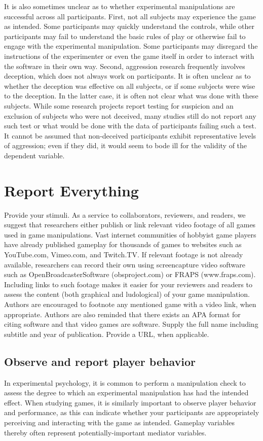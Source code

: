It is also sometimes unclear as to whether experimental manipulations are successful across all participants. First, not all subjects may experience the game as intended. Some participants may quickly understand the controls, while other participants may fail to understand the basic rules of play or otherwise fail to engage with the experimental manipulation. Some participants may disregard the instructions of the experimenter or even the game itself in order to interact with the software in their own way. Second, aggression research frequently involves deception, which does not always work on participants. It is often unclear as to whether the deception was effective on all subjects, or if some subjects were wise to the deception. In the latter case, it is often not clear what was done with these subjects. While some research projects report testing for suspicion and an exclusion of subjects who were not deceived, many studies still do not report any such test or what would be done with the data of participants failing such a test. It cannot be assumed that non-deceived participants exhibit representative levels of aggression; even if they did, it would seem to bode ill for the validity of the dependent variable.

\section{Report Everything}
Provide your stimuli. As a service to collaborators, reviewers, and readers, we suggest that researchers either publish or link relevant video footage of all games used in game manipulations. Vast internet communities of hobbyist game players have already published gameplay for thousands of games to websites such as YouTube.com, Vimeo.com, and Twitch.TV. If relevant footage is not already available, researchers can record their own using screencapture video software such as OpenBroadcasterSoftware (obsproject.com) or FRAPS (www.fraps.com). Including links to such footage makes it easier for your reviewers and readers to assess the content (both graphical and ludological) of your game manipulation. Authors are encouraged to footnote any mentioned game with a video link, when appropriate. Authors are also reminded that there exists an APA format for citing software and that video games are software. Supply the full name including subtitle and year of publication. Provide a URL, when applicable.

\subsection{Observe and report player behavior} In experimental psychology, it is common to perform a manipulation check to assess the degree to which an experimental manipulation has had the intended effect. When studying games, it is similarly important to observe player behavior and performance, as this can indicate whether your participants are appropriately perceiving and interacting with the game as intended. Gameplay variables thereby often represent potentially-important mediator variables.

